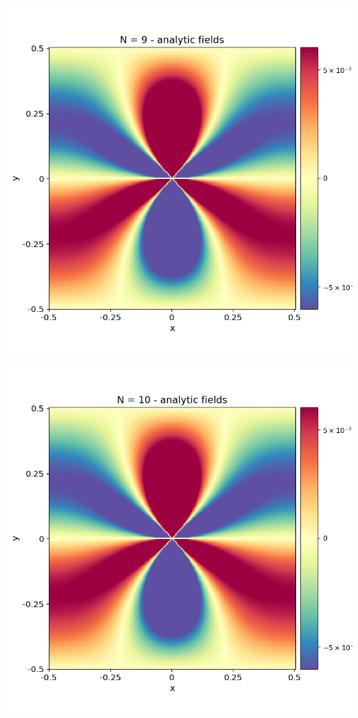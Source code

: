\documentclass[12pt,a4paper]{article}
\theoremstyle{plain}
\begin{document}
\begin{multicols*}{2}
	\begin{minipage}{0.22\columnwidth}
		\centering
		\includegraphics[width=\columnwidth]{./stress_field_09.png}
	\end{minipage}
	\begin{minipage}{0.22\columnwidth}
		\centering
		\includegraphics[width=\columnwidth]{./stress_field_10.png}

\end{minipage}
\end{multicols*}
\end{document}

